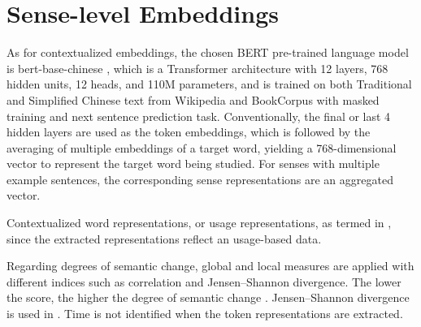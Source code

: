 \section{Sense-level Embeddings}
As for contextualized embeddings, the chosen BERT pre-trained language model is bert-base-chinese \parencite{devlin2018bert}, which is a Transformer architecture with 12 layers, 768 hidden units, 12 heads, and 110M parameters, and is trained on both Traditional and Simplified Chinese text from Wikipedia and BookCorpus with masked training and next sentence prediction task. Conventionally, the final or last 4 hidden layers are used as the token embeddings, which is followed by the averaging of multiple embeddings of a target word, yielding a 768-dimensional vector to represent the target word being studied. For senses with multiple example sentences, the corresponding sense representations are an aggregated vector.

Contextualized word representations, or usage representations, as termed in \parencite{giulianelli2019lexical}, since the extracted representations reflect an usage-based data.

Regarding degrees of semantic change, global and local measures are applied with different indices such as correlation and Jensen–Shannon divergence. The lower the score, the higher the degree of semantic change \parencite{hamilton2016law}. Jensen–Shannon divergence is used in \textcite{giulianelli2019lexical}. Time is not identified when the token representations are extracted.

